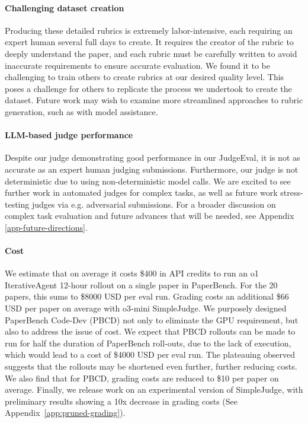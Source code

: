 \documentclass{article}
\theoremstyle{plain}
\theoremstyle{definition}
\theoremstyle{remark}
\begin{document}
\paragraph{Challenging dataset creation} Producing these detailed rubrics is extremely labor-intensive, each requiring an expert human several full days to create. It requires the creator of the rubric to deeply understand the paper, and each rubric must be carefully written to avoid inaccurate requirements to ensure accurate evaluation. We found it to be challenging to train others to create rubrics at our desired quality level. This poses a challenge for others to replicate the process we undertook to create the dataset. Future work may wish to examine more streamlined approaches to rubric generation, such as with model assistance.

\paragraph{LLM-based judge performance} Despite our judge demonstrating good performance in our JudgeEval, it is not as accurate as an expert human judging submissions. Furthermore, our judge is not deterministic due to using non-deterministic model calls. We are excited to see further work in automated judges for complex tasks, as well as future work stress-testing judges via e.g. adversarial submissions. For a broader discussion on complex task evaluation and future advances that will be needed, see Appendix \ref{app-future-directions}.

\paragraph{Cost} 
We estimate that on average it costs \$400 in API credits to run an o1 IterativeAgent 12-hour rollout on a single paper in PaperBench. For the 20 papers, this sums to \$8000 USD per eval run. Grading costs an additional \$66 USD per paper on average with o3-mini SimpleJudge. We purposely designed PaperBench Code-Dev (PBCD) not only to eliminate the GPU requirement, but also to address the issue of cost. We expect that PBCD rollouts can be made to run for half the duration of PaperBench roll-outs, due to the lack of execution, which would lead to a cost of \$4000 USD per eval run. The plateauing observed suggests that the rollouts may be shortened even further, further reducing costs. We also find that for PBCD, grading costs are reduced to \$10 per paper on average. Finally, we release work on an experimental version of SimpleJudge, with preliminary results showing a 10x decrease in grading costs (See Appendix~\ref{app:pruned-grading}).
\end{document}
